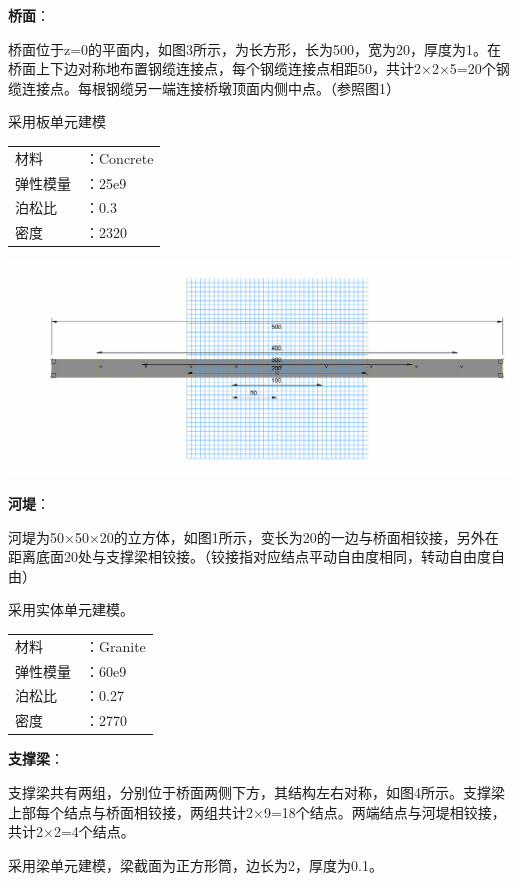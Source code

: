 \documentclass[UTF8]{ctexbook}
\begin{document}
\textbf{桥面}：

桥面位于z=0的平面内，如图3所示，为长方形，长为500，宽为20，厚度为1。在桥面上下边对称地布置钢缆连接点，每个钢缆连接点相距50，共计2×2×5=20个钢缆连接点。每根钢缆另一端连接桥墩顶面内侧中点。（参照图1）

采用板单元建模

\begin{center}
\begin{tabular}{ll}
材料&：Concrete\\
弹性模量&：25e9\\
泊松比&：0.3\\
密度&：2320\\
\end{tabular}
\end{center}

\includegraphics[width=\textwidth]{03.png}

\textbf{河堤}：

河堤为50×50×20的立方体，如图1所示，变长为20的一边与桥面相铰接，另外在距离底面20处与支撑梁相铰接。（铰接指对应结点平动自由度相同，转动自由度自由）

采用实体单元建模。

\begin{center}
\begin{tabular}{ll}
材料&：Granite\\
弹性模量&：60e9\\
泊松比&：0.27\\
密度&：2770\\
\end{tabular}
\end{center}

\textbf{支撑梁}：

支撑梁共有两组，分别位于桥面两侧下方，其结构左右对称，如图4所示。支撑梁上部每个结点与桥面相铰接，两组共计2×9=18个结点。两端结点与河堤相铰接，共计2×2=4个结点。

采用梁单元建模，梁截面为正方形筒，边长为2，厚度为0.1。
\end{document}
